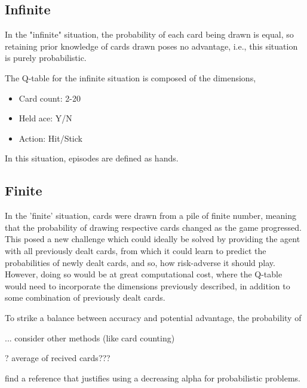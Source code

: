 \subsection{Infinite}

In the "infinite" situation, the probability of each card being drawn is equal, so retaining prior knowledge of cards drawn poses no advantage, i.e., this situation is purely probabilistic. 

The Q-table for the infinite situation is composed of the dimensions, 
\begin{itemize}
    \item Card count: 2-20
    \item Held ace: Y/N
    \item Action: Hit/Stick
\end{itemize}

In this situation, episodes are defined as hands. 

\subsection{Finite}

In the 'finite' situation, cards were drawn from a pile of finite number, meaning that the probability of drawing respective cards changed as the game progressed. This posed a new challenge which could ideally be solved by providing the agent with all previously dealt cards, from which it could learn to predict the probabilities of newly dealt cards, and so, how risk-adverse it should play. However, doing so would be at great computational cost, where the Q-table would need to incorporate the dimensions previously described, in addition to some combination of previously dealt cards. 

To strike a balance between accuracy and potential advantage, the probability of 

... consider other methods (like card counting)

? average of recived cards???

find a reference that justifies using a decreasing alpha for probabilistic problems. 